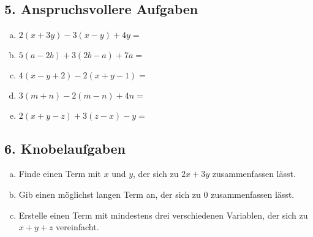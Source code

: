 \subsection*{5. Anspruchsvollere Aufgaben}
\begin{enumerate}[a)]
    \item $2(x + 3y) - 3(x - y) + 4y =$
    \item $5(a - 2b) + 3(2b - a) + 7a =$
    \item $4(x - y + 2) - 2(x + y - 1) =$
    \item $3(m + n) - 2(m - n) + 4n =$
    \item $2(x + y - z) + 3(z - x) - y =$
\end{enumerate}

\subsection*{6. Knobelaufgaben}
\begin{enumerate}[a)]
    \item Finde einen Term mit $x$ und $y$, der sich zu $2x + 3y$ zusammenfassen lässt.
    \item Gib einen möglichst langen Term an, der sich zu $0$ zusammenfassen lässt.
    \item Erstelle einen Term mit mindestens drei verschiedenen Variablen, der sich zu $x + y + z$ vereinfacht.
\end{enumerate}

